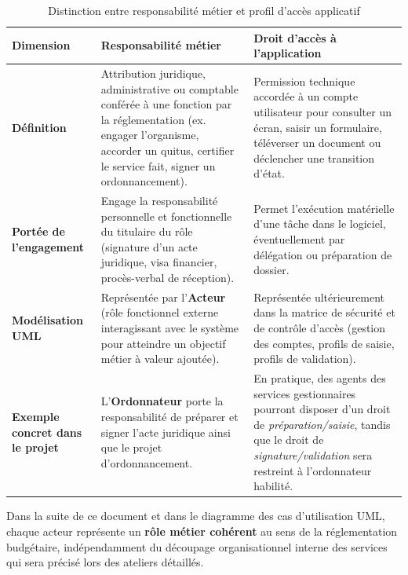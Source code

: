 \begin{table}[H]
\centering
\small
\caption{Distinction entre responsabilité métier et profil d'accès applicatif}
\label{tab:distinction_metier_acces}
\begin{tabularx}{\linewidth}{L{3.5cm} Y Y}
\toprule
\textbf{\sffamily Dimension} & \textbf{\sffamily Responsabilité métier} & \textbf{\sffamily Droit d'accès à l'application} \\
\midrule
\textbf{Définition} & Attribution juridique, administrative ou comptable conférée à une fonction par la réglementation (ex. engager l'organisme, accorder un quitus, certifier le service fait, signer un ordonnancement). & Permission technique accordée à un compte utilisateur pour consulter un écran, saisir un formulaire, téléverser un document ou déclencher une transition d'état. \\
\textbf{Portée de l'engagement} & Engage la responsabilité personnelle et fonctionnelle du titulaire du rôle (signature d'un acte juridique, visa financier, procès-verbal de réception). & Permet l'exécution matérielle d'une tâche dans le logiciel, éventuellement par délégation ou préparation de dossier. \\
\textbf{Modélisation UML} & Représentée par l'\textbf{Acteur} (rôle fonctionnel externe interagissant avec le système pour atteindre un objectif métier à valeur ajoutée). & Représentée ultérieurement dans la matrice de sécurité et de contrôle d'accès (gestion des comptes, profils de saisie, profils de validation). \\
\textbf{Exemple concret dans le projet} & L'\textbf{Ordonnateur} porte la responsabilité de préparer et signer l'acte juridique ainsi que le projet d'ordonnancement. & En pratique, des agents des services gestionnaires pourront disposer d'un droit de \emph{préparation/saisie}, tandis que le droit de \emph{signature/validation} sera restreint à l'ordonnateur habilité. \\
\bottomrule
\end{tabularx}
\end{table}

Dans la suite de ce document et dans le diagramme des cas d'utilisation UML, chaque acteur représente un \textbf{rôle métier cohérent} au sens de la réglementation budgétaire, indépendamment du découpage organisationnel interne des services qui sera précisé lors des ateliers détaillés.
